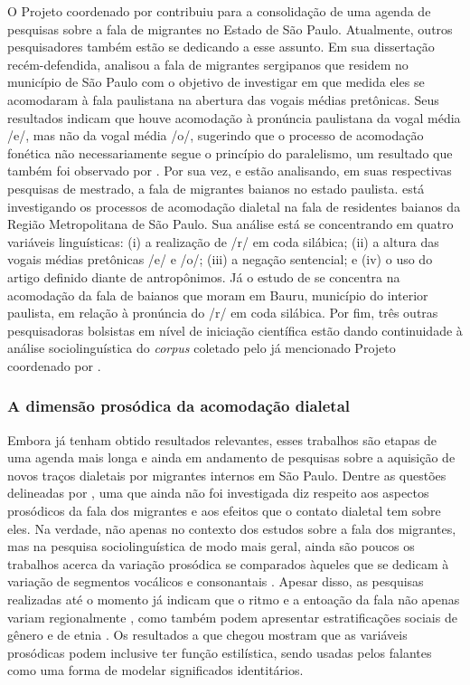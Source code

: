 \documentclass[12pt,a4paper,oneside]{article}
\begin{document}
		O Projeto coordenado por \citet{Oushiro2018} contribuiu para a consolidação de uma
		agenda de pesquisas sobre a fala de migrantes no Estado de São Paulo. Atualmente,
		outros pesquisadores também estão se dedicando a esse assunto. Em sua dissertação
		recém-defendida, \citet{Santana2019} analisou a fala de migrantes sergipanos que
		residem no município de São Paulo com o objetivo de investigar em que medida eles se
		acomodaram à fala paulistana na abertura das vogais médias pretônicas. Seus
		resultados indicam que houve acomodação à pronúncia paulistana da vogal média /e/,
		mas não da vogal média /o/, sugerindo que o processo de acomodação fonética não
		necessariamente segue o princípio do paralelismo, um resultado que também foi
		observado por \citet{Oushiro2019a}. Por sua vez, \citet{Souza2017} e
		\citet{Oliveira2019} estão analisando, em suas respectivas pesquisas de mestrado, a
		fala de migrantes baianos no estado paulista. \citet{Souza2017} está investigando os
		processos de acomodação dialetal na fala de residentes baianos da Região
		Metropolitana de São Paulo. Sua análise está se concentrando em quatro variáveis
		linguísticas: (i) a realização de /r/ em coda silábica; (ii) a altura das vogais
		médias pretônicas /e/ e /o/; (iii) a negação sentencial; e (iv) o uso do artigo
		definido diante de antropônimos. Já o estudo de \citet{Oliveira2019} se concentra na
		acomodação da fala de baianos que moram em Bauru, município do interior paulista, em
		relação à pronúncia do /r/ em coda silábica. Por fim, três outras pesquisadoras
		bolsistas em nível de iniciação científica estão dando continuidade à análise
		sociolinguística do \emph{corpus} coletado pelo já mencionado Projeto coordenado por
		\citet{Oushiro2018}.

		\subsubsection*{A dimensão prosódica da acomodação dialetal}

		Embora já tenham obtido resultados relevantes, esses trabalhos são etapas de uma
		agenda mais longa e ainda em andamento de pesquisas sobre a aquisição de novos
		traços dialetais por migrantes internos em São Paulo. Dentre as questões delineadas
		por \citet{Oushiro2018}, uma que ainda não foi investigada diz respeito aos aspectos
		prosódicos da fala dos migrantes e aos efeitos que o contato dialetal tem sobre
		eles.  Na verdade, não apenas no contexto dos estudos sobre a fala dos migrantes,
		mas na pesquisa sociolinguística de modo mais geral, ainda são poucos os trabalhos
		acerca da variação prosódica se comparados àqueles que se dedicam à variação de
		segmentos vocálicos e consonantais \citep{Thomas2013, Hay.Drager2007}. Apesar disso, as
		pesquisas realizadas até o momento já indicam que o ritmo e a entoação da fala não
		apenas variam regionalmente \citep{Clopper.Smiljanic2015,Grabe.etal2000}, como também podem
		apresentar estratificações sociais de gênero \citep{Lowry2011} e de etnia
		\citep{Thomas2013, Szakay2006}. Os resultados a que \citet{Podesva2011} chegou
		mostram que as variáveis prosódicas podem inclusive ter função estilística, sendo
		usadas pelos falantes como uma forma de modelar significados identitários.
\end{document}
